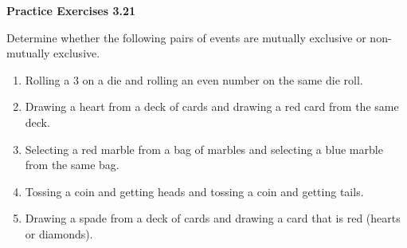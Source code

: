 \vspace{0.3ex}
\noindent\textbf{Practice Exercises 3.21}

\vspace{0.2ex}

Determine whether the following pairs of events are mutually exclusive or non-mutually exclusive.

\begin{enumerate}[label=\color{blue}\arabic*.]
    \item Rolling a 3 on a die and rolling an even number on the same die roll.
    \item Drawing a heart from a deck of cards and drawing a red card from the same deck.
    \item Selecting a red marble from a bag of marbles and selecting a blue marble from the same bag.
    \item Tossing a coin and getting heads and tossing a coin and getting tails.
    \item Drawing a spade from a deck of cards and drawing a card that is red (hearts or diamonds).
\end{enumerate}
